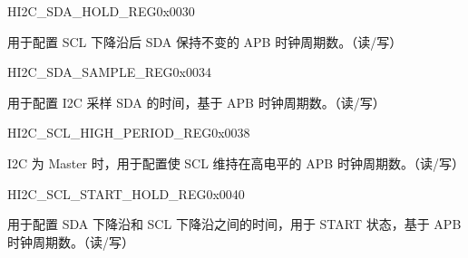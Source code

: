 \documentclass[main.tex]{subfiles}
\begin{document}
\begin{register}{H}{I2C\_SDA\_HOLD\_REG}{0x0030}\label{regdesc:I2CSDAHOLDREG}
%
%
\regnewline%
\begin{regdesc}\begin{reglist}
\item [I2C\_SDA\_HOLD\_TIME]
用于配置 SCL 下降沿后 SDA 保持不变的 APB 时钟周期数。（读/写）
\end{reglist}\end{regdesc}
\end{register}


\begin{register}{H}{I2C\_SDA\_SAMPLE\_REG}{0x0034}\label{regdesc:I2CSDASAMPLEREG}
%
%
\regnewline%
\begin{regdesc}\begin{reglist}
\item [I2C\_SDA\_SAMPLE\_TIME] 用于配置 I2C 采样 SDA 的时间，基于 APB 时钟周期数。（读/写）
\end{reglist}\end{regdesc}
\end{register}


\begin{register}{H}{I2C\_SCL\_HIGH\_PERIOD\_REG}{0x0038}\label{regdesc:I2CSCLHIGHPERIODREG}
%
%
\regnewline%
\begin{regdesc}\begin{reglist}
\item [I2C\_SCL\_HIGH\_PERIOD]I2C 为 Master 时，用于配置使 SCL 维持在高电平的 APB 时钟周期数。（读/写）
\end{reglist}\end{regdesc}
\end{register}


\begin{register}{H}{I2C\_SCL\_START\_HOLD\_REG}{0x0040}\label{regdesc:I2CSCLSTARTHOLDREG}
%
%
\regnewline%
\begin{regdesc}\begin{reglist}
\item [I2C\_SCL\_START\_HOLD\_TIME] 用于配置 SDA 下降沿和 SCL 下降沿之间的时间，用于 START 状态，基于 APB 时钟周期数。（读/写）
\end{reglist}\end{regdesc}
\end{register}
\end{document}
